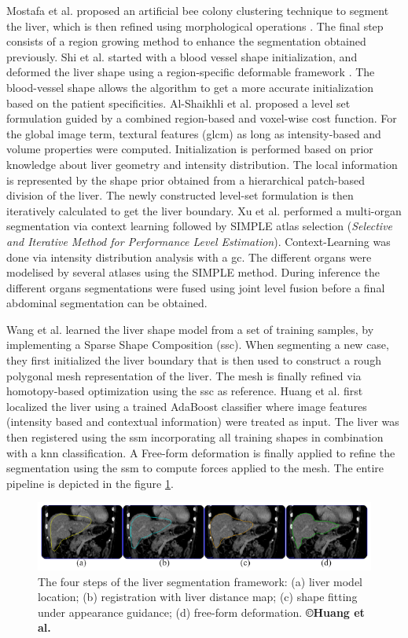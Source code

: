 Mostafa et al.\cite{Mostafa2015} proposed an artificial bee colony clustering technique to
segment the liver, which is then refined using morphological operations .
The final step consists of a region growing method to enhance the
segmentation obtained previously.
Shi et al. started with a blood vessel shape initialization, and deformed
the liver shape using a region-specific deformable framework \cite{Shi2016}. The
blood-vessel shape allows the algorithm to get a more accurate
initialization based on the patient specificities. Al-Shaikhli et al. \cite{Al-Shaikhli2015} proposed a level set formulation guided by a combined region-based and
voxel-wise cost function. For the global image term, textural features
(\ac{glcm}) as long as intensity-based and volume properties were computed.
Initialization is performed based on prior knowledge about liver
geometry and intensity distribution. The local information is
represented by the shape prior obtained from a hierarchical patch-based
division of the liver. The newly constructed level-set formulation is
then iteratively calculated to get the liver boundary.
Xu et al. \cite{Xu2015} performed a multi-organ segmentation via context learning
followed by SIMPLE atlas selection (\emph{Selective and Iterative Method
	for Performance Level Estimation}). Context-Learning was done via
intensity distribution analysis with a \ac{gc}. The different organs were modelised by several atlases using
the SIMPLE method. During inference the different organs segmentations
were fused using joint level fusion before a final abdominal
segmentation can be obtained.

Wang et al. \cite{Wang2015b} learned the liver shape model from a set of training
samples, by implementing a Sparse Shape Composition (\ac{ssc}). When
segmenting a new case, they first initialized the liver boundary that is
then used to construct a rough polygonal mesh representation of the
liver. The mesh is finally refined via homotopy-based optimization using
the \ac{ssc} as reference.
Huang et al. \cite{Huang2014} first localized the liver using a trained AdaBoost
classifier where image features (intensity based and contextual
information) were treated as input. The liver was then registered using
the \ac{ssm} incorporating all training shapes in combination with a \ac{knn}
classification. A Free-form deformation is finally applied to refine the
segmentation using the \ac{ssm} to compute forces applied to the mesh. The
entire pipeline is depicted in the figure \ref{Huang2014_Fig1}.


\begin{figure}[th!]
	\centering
	\includegraphics[width=0.9\linewidth]{images/Huang2014_Fig4_v2}
	\caption{The four steps of the liver segmentation framework: (a) liver model location; (b) registration with liver distance map; (c) shape fitting under appearance guidance; (d) free-form deformation. \textbf{©Huang et al. \cite{Huang2014}}}
	\label{Huang2014_Fig1}
\end{figure}


